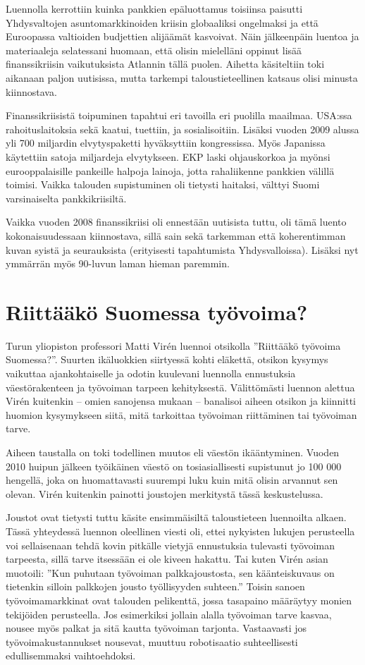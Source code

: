 \documentclass[12pt]{article}
\begin{document}
Luennolla kerrottiin kuinka pankkien epäluottamus toisiinsa paisutti Yhdysvaltojen asuntomarkkinoiden kriisin globaaliksi ongelmaksi ja että Euroopassa valtioiden budjettien alijäämät kasvoivat. Näin jälkeenpäin luentoa ja materiaaleja selatessani huomaan, että olisin mielelläni oppinut lisää finanssikriisin vaikutuksista Atlannin tällä puolen. Aihetta käsiteltiin toki aikanaan paljon uutisissa, mutta tarkempi taloustieteellinen katsaus olisi minusta kiinnostava.

Finanssikriisistä toipuminen tapahtui eri tavoilla eri puolilla maailmaa. USA:ssa rahoituslaitoksia sekä kaatui, tuettiin, ja sosialisoitiin. Lisäksi vuoden 2009 alussa yli 700 miljardin elvytyspaketti hyväksyttiin kongressissa. Myös Japanissa käytettiin satoja miljardeja elvytykseen. EKP laski ohjauskorkoa ja myönsi eurooppalaisille pankeille halpoja lainoja, jotta rahaliikenne pankkien välillä toimisi. Vaikka talouden supistuminen oli tietysti haitaksi, välttyi Suomi varsinaiselta pankkikriisiltä.

Vaikka vuoden 2008 finanssikriisi oli ennestään uutisista tuttu, oli tämä luento kokonaisuudessaan kiinnostava, sillä sain sekä tarkemman että koherentimman kuvan syistä ja seurauksista (erityisesti tapahtumista Yhdysvalloissa). Lisäksi nyt ymmärrän myös 90-luvun laman hieman paremmin.


\newpage
\section{Riittääkö Suomessa työvoima?}

Turun yliopiston professori Matti Virén luennoi otsikolla ''Riittääkö työvoima Suomessa?''. Suurten ikäluokkien siirtyessä kohti eläkettä, otsikon kysymys vaikuttaa ajankohtaiselle ja odotin kuulevani luennolla ennustuksia väes\-tö\-ra\-ken\-teen ja työvoiman tarpeen kehityksestä. Välittömästi luennon alettua Virén kuitenkin -- omien sanojensa mukaan -- banalisoi aiheen otsikon ja kiinnitti huomion kysymykseen siitä, mitä tarkoittaa työvoiman riittäminen tai työvoiman tarve.

Aiheen taustalla on toki todellinen muutos eli väestön ikääntyminen. Vuoden 2010 huipun jälkeen työikäinen väestö on tosiasiallisesti supistunut jo 100 000 hengellä, joka on huomattavasti suurempi luku kuin mitä olisin arvannut sen olevan. Virén kuitenkin painotti joustojen merkitystä tässä keskustelussa.

Joustot ovat tietysti tuttu käsite ensimmäisiltä taloustieteen luennoilta alkaen. Tässä yhteydessä luennon oleellinen viesti oli, ettei nykyisten lukujen perusteella voi sellaisenaan tehdä kovin pitkälle vietyjä ennustuksia tulevasti työvoiman tarpeesta, sillä tarve itsessään ei ole kiveen hakattu. Tai kuten Virén asian muotoili: ''Kun puhutaan työvoiman palkkajoustosta, sen käänteiskuvaus on tietenkin silloin palkkojen jousto työllisyyden suhteen.'' Toisin sanoen työvoimamarkkinat ovat talouden pelikenttä, jossa tasapaino määräytyy monien tekijöiden perusteella. Jos esimerkiksi jollain alalla työvoiman tarve kasvaa, nousee myös palkat ja sitä kautta työvoiman tarjonta. Vastaavasti jos työvoimakustannukset nousevat, muuttuu robotisaatio suhteellisesti edullisemmaksi vaihtoehdoksi.
\end{document}
